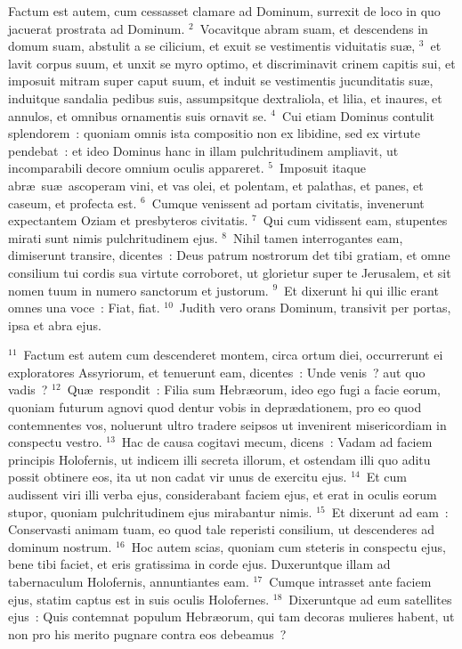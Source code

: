 \lettrine[lines=3,image=true,loversize=0.05,lraise=-0.03]{F}{}actum est autem, cum cessasset clamare ad Dominum, surrexit de loco in quo jacuerat prostrata ad Dominum.
${}^{2}$~Vocavitque abram suam, et descendens in domum suam, abstulit a se cilicium, et exuit se vestimentis viduitatis su\ae ,
${}^{3}$~et lavit corpus suum, et unxit se myro optimo, et discriminavit crinem capitis sui, et imposuit mitram super caput suum, et induit se vestimentis jucunditatis su\ae , induitque sandalia pedibus suis, assumpsitque dextraliola, et lilia, et inaures, et annulos, et omnibus ornamentis suis ornavit se.
${}^{4}$~Cui etiam Dominus contulit splendorem~: quoniam omnis ista compositio non ex libidine, sed ex virtute pendebat~: et ideo Dominus hanc in illam pulchritudinem ampliavit, ut incomparabili decore omnium oculis appareret.
${}^{5}$~Imposuit itaque abr\ae\ su\ae\ ascoperam vini, et vas olei, et polentam, et palathas, et panes, et caseum, et profecta est.
${}^{6}$~Cumque venissent ad portam civitatis, invenerunt expectantem Oziam et presbyteros civitatis.
${}^{7}$~Qui cum vidissent eam, stupentes mirati sunt nimis pulchritudinem ejus.
${}^{8}$~Nihil tamen interrogantes eam, dimiserunt transire, dicentes~: Deus patrum nostrorum det tibi gratiam, et omne consilium tui cordis sua virtute corroboret, ut glorietur super te Jerusalem, et sit nomen tuum in numero sanctorum et justorum.
${}^{9}$~Et dixerunt hi qui illic erant omnes una voce~: Fiat, fiat.
${}^{10}$~Judith vero orans Dominum, transivit per portas, ipsa et abra ejus.


${}^{11}$~Factum est autem cum descenderet montem, circa ortum diei, occurrerunt ei exploratores Assyriorum, et tenuerunt eam, dicentes~: Unde venis~? aut quo vadis~?
${}^{12}$~Qu\ae\ respondit~: Filia sum Hebr\ae orum, ideo ego fugi a facie eorum, quoniam futurum agnovi quod dentur vobis in depr\ae dationem, pro eo quod contemnentes vos, noluerunt ultro tradere seipsos ut invenirent misericordiam in conspectu vestro.
${}^{13}$~Hac de causa cogitavi mecum, dicens~: Vadam ad faciem principis Holofernis, ut indicem illi secreta illorum, et ostendam illi quo aditu possit obtinere eos, ita ut non cadat vir unus de exercitu ejus.
${}^{14}$~Et cum audissent viri illi verba ejus, considerabant faciem ejus, et erat in oculis eorum stupor, quoniam pulchritudinem ejus mirabantur nimis.
${}^{15}$~Et dixerunt ad eam~: Conservasti animam tuam, eo quod tale reperisti consilium, ut descenderes ad dominum nostrum.
${}^{16}$~Hoc autem scias, quoniam cum steteris in conspectu ejus, bene tibi faciet, et eris gratissima in corde ejus. Duxeruntque illam ad tabernaculum Holofernis, annuntiantes eam.
${}^{17}$~Cumque intrasset ante faciem ejus, statim captus est in suis oculis Holofernes.
${}^{18}$~Dixeruntque ad eum satellites ejus~: Quis contemnat populum Hebr\ae orum, qui tam decoras mulieres habent, ut non pro his merito pugnare contra eos debeamus~?


